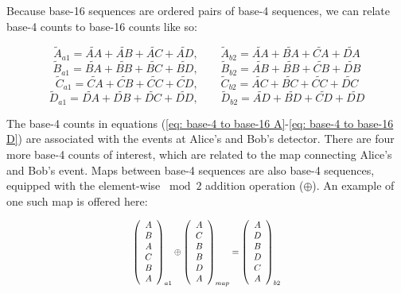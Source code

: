 \documentclass{article}
\begin{document}
Because base-16 sequences are ordered pairs of base-4 sequences, we can relate base-4 counts to base-16 counts like so:

\begin{equation}
\tilde{A}_{a1}=\widetilde{AA}+\widetilde{AB}+\widetilde{AC}+\widetilde{AD},\qquad\tilde{A}_{b2}=\widetilde{AA}+\widetilde{BA}+\widetilde{CA}+\widetilde{DA}
\label{eq: base-4 to base-16 A}
\end{equation}
\begin{equation}
\tilde{B}_{a1}=\widetilde{BA}+\widetilde{BB}+\widetilde{BC}+\widetilde{BD},\qquad\tilde{B}_{b2}=\widetilde{AB}+\widetilde{BB}+\widetilde{CB}+\widetilde{DB}
\label{eq: base-4 to base-16 B}
\end{equation}
\begin{equation}
\tilde{C}_{a1}=\widetilde{CA}+\widetilde{CB}+\widetilde{CC}+\widetilde{CD},\qquad\tilde{C}_{b2}=\widetilde{AC}+\widetilde{BC}+\widetilde{CC}+\widetilde{DC}
\label{eq: base-4 to base-16 C}
\end{equation}
\begin{equation}
\tilde{D}_{a1}=\widetilde{DA}+\widetilde{DB}+\widetilde{DC}+\widetilde{DD},\qquad\tilde{D}_{b2}=\widetilde{AD}+\widetilde{BD}+\widetilde{CD}+\widetilde{DD}
\label{eq: base-4 to base-16 D}
\end{equation}

The base-4 counts in equations (\ref{eq: base-4 to base-16 A}-\ref{eq: base-4 to base-16 D}) are associated with the events at Alice's and Bob's detector. There are four more base-4 counts of interest, which are related to the map connecting Alice's and Bob's event. Maps between base-4 sequences are also base-4 sequences, equipped with the element-wise $\bmod{2}$ addition operation ($\oplus$). An example of one such map is offered here:

\begin{equation}
\scalebox{0.8}{$\begin{aligned}
\left(\begin{array}{c}
A\\
B\\
A\\
C\\
B\\
A
\end{array}\right)_{a1}\oplus\left(\begin{array}{c}
A\\
C\\
B\\
B\\
D\\
A
\end{array}\right)_{map}=\left(\begin{array}{c}
A\\
D\\
B\\
D\\
C\\
A
\end{array}\right)_{b2}
\end{aligned}$}
\label{eq: map}
\end{equation}
\end{document}
